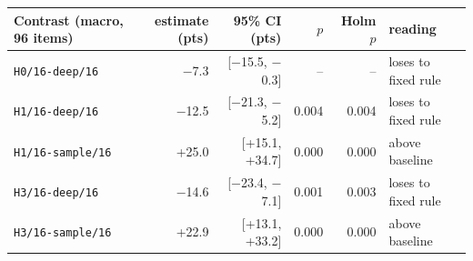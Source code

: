 \begin{tabular}{lrrrrl}
\toprule
Contrast (macro, 96 items) & estimate (pts) & 95\% CI (pts) & $p$ & Holm $p$ & reading \\ \midrule
\texttt{H0/16-deep/16} & $-$7.3 & [$-$15.5, $-$0.3] & -- & -- & loses to fixed rule \\
\texttt{H1/16-deep/16} & $-$12.5 & [$-$21.3, $-$5.2] & 0.004 & 0.004 & loses to fixed rule \\
\texttt{H1/16-sample/16} & +25.0 & [+15.1, +34.7] & 0.000 & 0.000 & above baseline \\
\texttt{H3/16-deep/16} & $-$14.6 & [$-$23.4, $-$7.1] & 0.001 & 0.003 & loses to fixed rule \\
\texttt{H3/16-sample/16} & +22.9 & [+13.1, +33.2] & 0.000 & 0.000 & above baseline \\
\bottomrule
\end{tabular}

